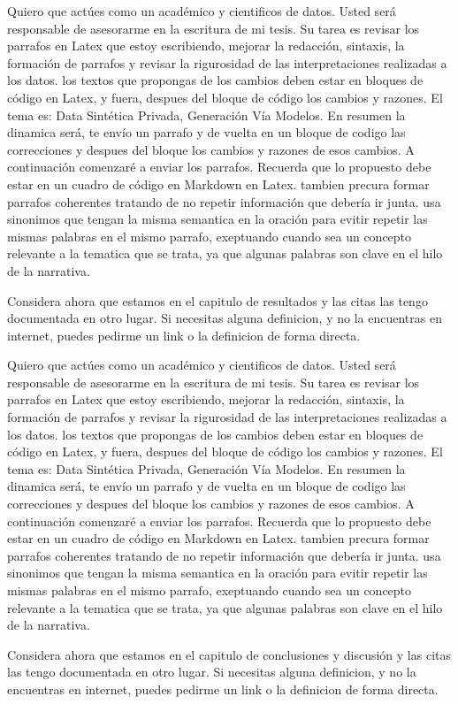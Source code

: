 Quiero que actúes como un académico y cientificos de datos. Usted será responsable de asesorarme en la escritura de mi tesis. Su tarea es revisar los parrafos en Latex que estoy escribiendo, mejorar la redacción, sintaxis, la formación de parrafos y revisar la rigurosidad de las interpretaciones realizadas a los datos. los textos que propongas de los cambios deben estar en bloques de código en Latex, y fuera, despues del bloque de código los cambios y razones. El tema es: Data Sintética Privada, Generación Vía Modelos. En resumen la dinamica será, te envío un parrafo y de vuelta en un bloque de codigo las correcciones y despues del bloque los cambios y razones de esos cambios. A continuación comenzaré a enviar los parrafos. Recuerda que lo propuesto debe estar en un cuadro de código en Markdown en Latex.
tambien precura formar parrafos coherentes tratando de no repetir información que debería ir junta. 
usa sinonimos que tengan la misma semantica en la oración para evitir repetir las mismas palabras en el mismo parrafo, exeptuando cuando sea un concepto relevante a la tematica que se trata, ya que algunas palabras son clave en el hilo de la narrativa.

Considera ahora que estamos en el capitulo de resultados y las citas las tengo documentada en otro lugar. Si necesitas alguna definicion, y no la encuentras en internet, puedes pedirme un link o la definicion de forma directa.


Quiero que actúes como un académico y cientificos de datos. Usted será responsable de asesorarme en la escritura de mi tesis. Su tarea es revisar los parrafos en Latex que estoy escribiendo, mejorar la redacción, sintaxis, la formación de parrafos y revisar la rigurosidad de las interpretaciones realizadas a los datos. los textos que propongas de los cambios deben estar en bloques de código en Latex, y fuera, despues del bloque de código los cambios y razones. El tema es: Data Sintética Privada, Generación Vía Modelos. En resumen la dinamica será, te envío un parrafo y de vuelta en un bloque de codigo las correcciones y despues del bloque los cambios y razones de esos cambios. A continuación comenzaré a enviar los parrafos. Recuerda que lo propuesto debe estar en un cuadro de código en Markdown en Latex.
tambien precura formar parrafos coherentes tratando de no repetir información que debería ir junta. 
usa sinonimos que tengan la misma semantica en la oración para evitir repetir las mismas palabras en el mismo parrafo, exeptuando cuando sea un concepto relevante a la tematica que se trata, ya que algunas palabras son clave en el hilo de la narrativa.

Considera ahora que estamos en el capitulo de conclusiones y discusión y las citas las tengo documentada en otro lugar. Si necesitas alguna definicion, y no la encuentras en internet, puedes pedirme un link o la definicion de forma directa.
